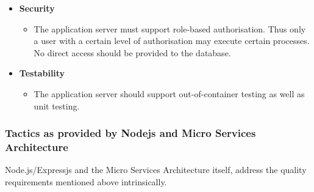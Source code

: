 \documentclass[a4paper,12pt]{article}
\begin{document}
\begin{itemize}
		\item\textbf{Security}
		\begin{itemize}
			\item The application server must support role-based authorisation. Thus only a user with a certain level of authorisation may execute certain processes. No direct access should be provided to the database. 
		\end{itemize}
		
		\item\textbf{Testability}
		\begin{itemize}
			\item The application server should support out-of-container testing as well as unit testing.
		\end{itemize}
		
	\end{itemize}
	
	\newpage
	\subsubsection{Tactics as provided by Nodejs and Micro Services Architecture}
	Node.js/Expressjs and the Micro Services Architecture itself, address the quality requirements mentioned above intrinsically.
	
\end{document}

